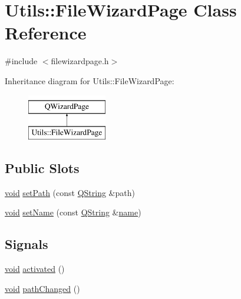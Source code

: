 \hypertarget{class_utils_1_1_file_wizard_page}{\section{Utils\-:\-:File\-Wizard\-Page Class Reference}
\label{class_utils_1_1_file_wizard_page}
}


{\ttfamily \#include $<$filewizardpage.\-h$>$}

Inheritance diagram for Utils\-:\-:File\-Wizard\-Page\-:\begin{figure}[H]
\begin{center}
\leavevmode
\includegraphics[height=2.000000cm]{class_utils_1_1_file_wizard_page}
\end{center}
\end{figure}
\subsection*{Public Slots}
\begin{DoxyCompactItemize}
\item 
\hyperlink{group___u_a_v_objects_plugin_ga444cf2ff3f0ecbe028adce838d373f5c}{void} \hyperlink{class_utils_1_1_file_wizard_page_aa369336019ec0a3440eeded6a7364290}{set\-Path} (const \hyperlink{group___u_a_v_objects_plugin_gab9d252f49c333c94a72f97ce3105a32d}{Q\-String} \&path)
\item 
\hyperlink{group___u_a_v_objects_plugin_ga444cf2ff3f0ecbe028adce838d373f5c}{void} \hyperlink{class_utils_1_1_file_wizard_page_a7d3a8653221422ee299c0ce026c67707}{set\-Name} (const \hyperlink{group___u_a_v_objects_plugin_gab9d252f49c333c94a72f97ce3105a32d}{Q\-String} \&\hyperlink{glext_8h_ad977737dfc9a274a62741b9500c49a32}{name})
\end{DoxyCompactItemize}
\subsection*{Signals}
\begin{DoxyCompactItemize}
\item 
\hyperlink{group___u_a_v_objects_plugin_ga444cf2ff3f0ecbe028adce838d373f5c}{void} \hyperlink{class_utils_1_1_file_wizard_page_aad2634d8d10b55dd107b9ad657dd9914}{activated} ()
\item 
\hyperlink{group___u_a_v_objects_plugin_ga444cf2ff3f0ecbe028adce838d373f5c}{void} \hyperlink{class_utils_1_1_file_wizard_page_a009e6ae82f20b3165360ede93cce10f1}{path\-Changed} ()
\end{DoxyCompactItemize}
